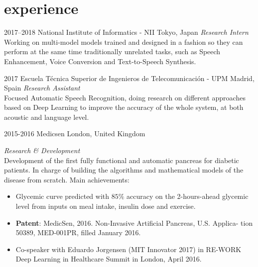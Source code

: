 \documentclass[]{friggeri-cv-a4}
\begin{document}

\section{experience}

\begin{entrylist}


\entry
{2017--2018}
{National Institute of Informatics - NII}
{Tokyo, Japan}
{\emph{Research Intern} \\
Working on multi-model models trained and designed in a fashion so they can perform at the same time traditionally unrelated tasks, such as Speech Enhancement, Voice Conversion and Text-to-Speech Synthesis.}

\end{entrylist}


\begin{entrylist}

\entry
{2017}
{Escuela Técnica Superior de Ingenieros de Telecomunicación - UPM}
{Madrid, Spain}
{\emph{Research Assistant} \\
Focused Automatic Speech Recognition, doing research on different approaches based on Deep Learning to improve the accuracy of the whole system, at both acoustic and language level.}


\end{entrylist}


\begin{entrylist}


\entry
{2015-2016}
{Medicsen}
{London, United Kingdom}
{\emph{Research \& Development} \\
Development of the first fully functional and automatic pancreas for diabetic patients. In charge of building the algorithms and mathematical models of the disease from scratch. Main achievements: 
\begin{itemize}
\item Glycemic curve predicted with $85\%$ accuracy on the 2-hours-ahead glycemic level from inputs on meal intake, insulin dose and exercise.
\item \textbf{Patent}: MedicSen, 2016. Non-Invasive Artificial Pancreas, U.S. Applica-
tion 50389, MED-001PR, filled January 2016.
\item Co-speaker with Eduardo Jorgensen (MIT Innovator 2017) in RE-WORK Deep Learning
in Healthcare Summit in London, April 2016.
\end{itemize}
}

\end{entrylist}
\end{document}
